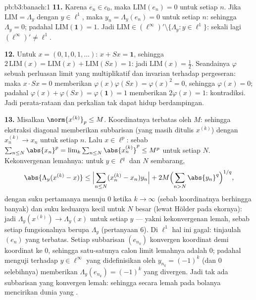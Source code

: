 \begin{solution}{pb:b3:banach:1}
\textbf{11.} Karena $e_n \in c_0$, maka $\mathrm{LIM}(e_n) = 0$ untuk setiap
$n$. Jika $\mathrm{LIM} = \Lambda_y$ dengan $y \in \ell^1$, maka
$y_n = \Lambda_y(e_n) = 0$ untuk setiap $n$: sehingga $\Lambda_y = 0$; padahal
$\mathrm{LIM}(\mathbf 1) = 1$. Jadi $\mathrm{LIM} \in
(\ell^\infty)' \setminus \{\Lambda_y : y \in \ell^1\}$:
sekali lagi $(\ell^\infty)' \neq \ell^1$.

\textbf{12.} Untuk $x = (0,1,0,1,\dots)$: $x + Sx = \mathbf 1$,
sehingga $2\,\mathrm{LIM}(x) = \mathrm{LIM}(x) + \mathrm{LIM}(Sx) =
1$: jadi $\mathrm{LIM}(x) = \frac12$. Seandainya $\varphi$ sebuah
perluasan limit yang multiplikatif dan invarian terhadap pergeseran: maka $x\cdot
Sx = 0$ memberikan $\varphi(x)\varphi(Sx) = \varphi(x)^2 = 0$, sehingga
$\varphi(x) = 0$; padahal $\varphi(x) + \varphi(Sx) =
\varphi(\mathbf 1) = 1$ memberikan $2\varphi(x) = 1$: kontradiksi.
Jadi perata-rataan dan perkalian tak dapat hidup berdampingan.

\textbf{13.} Misalkan $\norm{x^{(k)}}_p \leq M$. Koordinatnya
terbatas oleh $M$: sehingga ekstraksi diagonal memberikan subbarisan
(yang masih ditulis $x^{(k)}$) dengan $x^{(k)}_n \to x_n$ untuk setiap
$n$. Lalu $x \in \ell^p$: sebab $\sum_{n\leq N}\abs{x_n}^p =
\lim_k\sum_{n\leq N}\abs{x^{(k)}_n}^p \leq M^p$ untuk setiap $N$.
Kekonvergenan lemahnya: untuk $y \in \ell^q$ dan $N$ sembarang,
\[
\abs{\Lambda_y(x^{(k)} - x)} \leq
\Bigl|\sum_{n \leq N}(x^{(k)}_n - x_n)y_n\Bigr|
+ 2M\Bigl(\sum_{n>N}\abs{y_n}^q\Bigr)^{1/q},
\]
dengan suku pertamanya menuju $0$ ketika $k \to \infty$ (sebab koordinatnya
berhingga banyak) dan suku keduanya kecil untuk $N$ besar
(lewat Hölder pada ekornya): jadi $\Lambda_y(x^{(k)}) \to \Lambda_y(x)$
untuk setiap $y$ --- yakni kekonvergenan lemah, sebab setiap fungsionalnya berupa
$\Lambda_y$ (pertanyaan 6). Di $\ell^1$ hal ini gagal: tinjaulah
$(e_n)$ yang terbatas. Setiap subbarisan $(e_{n_k})$ konvergen
koordinat demi koordinat ke $0$, sehingga satu-satunya calon limit lemahnya adalah $0$;
padahal menguji terhadap $y \in \ell^\infty$ yang didefinisikan oleh $y_{n_k} =
(-1)^k$ (dan $0$ selebihnya) memberikan $\Lambda_y(e_{n_k}) = (-1)^k$
yang divergen. Jadi tak ada subbarisan yang konvergen lemah: sehingga  secara lemah pada bolanya mencirikan dunia yang .


\end{solution}
